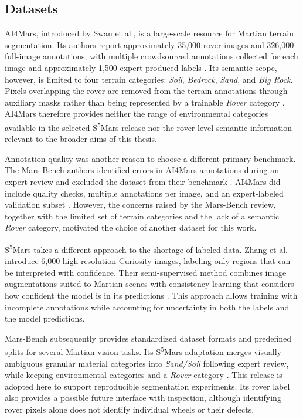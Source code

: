 \subsection{Datasets}
AI4Mars, introduced by Swan et al., is a large-scale resource for Martian terrain segmentation. Its authors report approximately 35,000 rover images and 326,000 full-image annotations, with multiple crowdsourced annotations collected for each image and approximately 1,500 expert-produced labels \cite{swan2021ai4mars}. Its semantic scope, however, is limited to four terrain categories: \emph{Soil}, \emph{Bedrock}, \emph{Sand}, and \emph{Big Rock}. Pixels overlapping the rover are removed from the terrain annotations through auxiliary masks rather than being represented by a trainable \emph{Rover} category \cite{swan2021ai4mars}. AI4Mars therefore provides neither the range of environmental categories available in the selected S\textsuperscript{5}Mars release nor the rover-level semantic information relevant to the broader aims of this thesis.

Annotation quality was another reason to choose a different primary benchmark. The Mars-Bench authors identified errors in AI4Mars annotations during an expert review and excluded the dataset from their benchmark \cite{purohit2025marsbench}. AI4Mars did include quality checks, multiple annotations per image, and an expert-labeled validation subset \cite{swan2021ai4mars}. However, the concerns raised by the Mars-Bench review, together with the limited set of terrain categories and the lack of a semantic \emph{Rover} category, motivated the choice of another dataset for this work.

S\textsuperscript{5}Mars takes a different approach to the shortage of labeled data. Zhang et al. introduce 6,000 high-resolution Curiosity images, labeling only regions that can be interpreted with confidence. Their semi-supervised method combines image augmentations suited to Martian scenes with consistency learning that considers how confident the model is in its predictions \cite{zhang2024s5mars}. This approach allows training with incomplete annotations while accounting for uncertainty in both the labels and the model predictions.

Mars-Bench subsequently provides standardized dataset formats and predefined splits for several Martian vision tasks. Its S\textsuperscript{5}Mars adaptation merges visually ambiguous granular material categories into \emph{Sand/Soil} following expert review, while keeping environmental categories and a \emph{Rover} category \cite{purohit2025marsbench}. This release is adopted here to support reproducible segmentation experiments. Its rover label also provides a possible future interface with inspection, although identifying rover pixels alone does not identify individual wheels or their defects.

